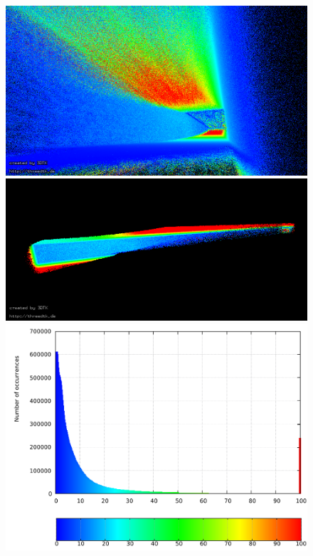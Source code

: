 \begin{figure}
 	\centering
 	\begin{minipage}[c]{0.495\textwidth}
 		\centering
		\includegraphics[width=\textwidth]{./images/uncorr_bottom_pose}\\
		\includegraphics[width=\textwidth]{./images/uncorr_side_view}\\
  		\includegraphics[width=\textwidth]{./images/uncorr_hist}

\end{minipage}
\end{figure}
